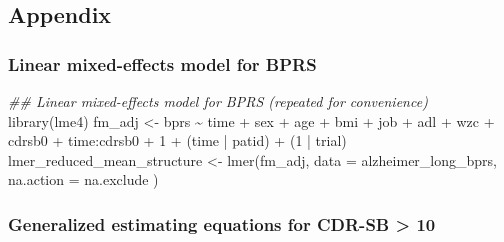 \documentclass[
  9pt,
  letterpaper,
  DIV=11,
  numbers=noendperiod]{scrartcl}
\newenvironment{Shaded}{\begin{snugshade}}{\end{snugshade}}
\newcommand{\AttributeTok}[1]{\textcolor[rgb]{0.40,0.45,0.13}{#1}}
\newcommand{\DecValTok}[1]{\textcolor[rgb]{0.68,0.00,0.00}{#1}}
\newcommand{\DocumentationTok}[1]{\textcolor[rgb]{0.37,0.37,0.37}{\textit{#1}}}
\newcommand{\FunctionTok}[1]{\textcolor[rgb]{0.28,0.35,0.67}{#1}}
\newcommand{\NormalTok}[1]{\textcolor[rgb]{0.00,0.23,0.31}{#1}}
\newcommand{\OtherTok}[1]{\textcolor[rgb]{0.00,0.23,0.31}{#1}}
\newcommand{\SpecialCharTok}[1]{\textcolor[rgb]{0.37,0.37,0.37}{#1}}
\begin{document}
\subsection{Appendix}\label{appendix}

\subsubsection{Linear mixed-effects model for
BPRS}\label{linear-mixed-effects-model-for-bprs}

\begin{Shaded}
\begin{Highlighting}[]
\DocumentationTok{\#\# Linear mixed{-}effects model for BPRS (repeated for convenience)}
\FunctionTok{library}\NormalTok{(lme4)}
\NormalTok{fm\_adj }\OtherTok{\textless{}{-}}\NormalTok{ bprs }\SpecialCharTok{\textasciitilde{}}\NormalTok{ time }\SpecialCharTok{+}\NormalTok{ sex }\SpecialCharTok{+}
\NormalTok{    age }\SpecialCharTok{+}\NormalTok{ bmi }\SpecialCharTok{+}\NormalTok{ job }\SpecialCharTok{+}\NormalTok{ adl }\SpecialCharTok{+}\NormalTok{ wzc }\SpecialCharTok{+}\NormalTok{ cdrsb0 }\SpecialCharTok{+}
\NormalTok{    time}\SpecialCharTok{:}\NormalTok{cdrsb0 }\SpecialCharTok{+}
    \DecValTok{1} \SpecialCharTok{+}\NormalTok{ (time }\SpecialCharTok{|}\NormalTok{ patid) }\SpecialCharTok{+}\NormalTok{ (}\DecValTok{1} \SpecialCharTok{|}\NormalTok{ trial)}
\NormalTok{lmer\_reduced\_mean\_structure }\OtherTok{\textless{}{-}} \FunctionTok{lmer}\NormalTok{(fm\_adj,}
    \AttributeTok{data =}\NormalTok{ alzheimer\_long\_bprs,}
    \AttributeTok{na.action =}\NormalTok{ na.exclude}
\NormalTok{)}
\end{Highlighting}
\end{Shaded}

\subsubsection{Generalized estimating equations for CDR-SB
\textgreater{} 10}\label{generalized-estimating-equations-for-cdr-sb-10}
\end{document}
